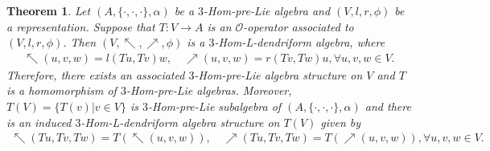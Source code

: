 \documentclass[a4paper,11pt]{article}
\def\c{\cdot}
\def\nw{\nwarrow}
\def\ne{\nearrow}
\newtheorem{thm}{Theorem}[section]
\theoremstyle{definition}
\begin{document}
\begin{thm}\label{3HomLden by O-op}
 Let $(A,\{\c,\c,\c\},\alpha)$ be a $3$-Hom-pre-Lie algebra and $(V,l,r,\phi)$ be a representation. Suppose that  $T: V \to A$ is an $\mathcal{O}$-operator associated to $(V,l,r,\phi)$. Then $(V,\nw,\ne,\phi)$ is a $3$-Hom-L-dendriform algebra, where
 \begin{align}
  \nw(u,v,w)=l(Tu,Tv)w  , \quad \ne(u, v,w)= r(Tv,Tw)u, \forall u,v,w \in V.
 \end{align}
 Therefore, there exists an associated $3$-Hom-pre-Lie algebra structure on $V$ and $T$ is a homomorphism of $3$-Hom-pre-Lie algebras. Moreover, $T(V)=\{T(v)| v \in V \}$ is $3$-Hom-pre-Lie subalgebra of $(A,\{\c,\c,\c\},\alpha)$ and there is an induced $3$-Hom-L-dendriform algebra structure on $T(V)$ given by
  \begin{align}
  \nw(Tu,Tv,Tw)=T(  \nw(u,v,w))  , \quad \ne(Tu, Tv,Tw)= T(\ne(u, v,w)), \forall u,v,w \in V.
 \end{align}

\end{thm}
\end{document}
